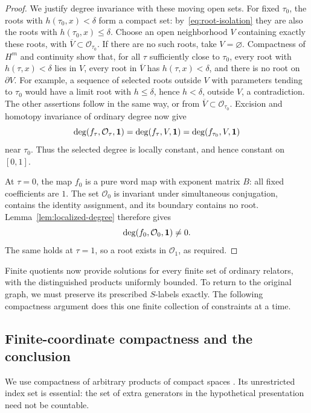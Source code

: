 \begin{proof}
We justify degree invariance with these moving open sets.  For fixed
$\tau_0$, the roots with $h(\tau_0,x)<\delta$ form a compact set:
by~\eqref{eq:root-isolation} they are also the roots with
$h(\tau_0,x)\le\delta$.  Choose an open neighborhood $V$ containing
exactly these roots, with
$\overline V\subset\mathcal O_{\tau_0}$.
If there are no such roots, take $V=\varnothing$.
Compactness of $H^m$ and continuity show that, for all $\tau$ sufficiently
close to $\tau_0$, every root with $h(\tau,x)<\delta$ lies in $V$,
every root in $\overline V$ has $h(\tau,x)<\delta$, and there is no
root on $\partial V$.  For example, a sequence of selected roots
outside $V$ with parameters tending to $\tau_0$ would have a limit
root with $h\le\delta$, hence $h<\delta$, outside $V$, a contradiction.
The other assertions follow in the same way, or from
$\overline V\subset\mathcal O_{\tau_0}$.
Excision and homotopy invariance of ordinary degree now give
\[
 \deg(f_\tau,\mathcal O_\tau,\mathbf 1)
       =\deg(f_\tau,V,\mathbf 1)
       =\deg(f_{\tau_0},V,\mathbf 1)
\]
near $\tau_0$.  Thus the selected degree is locally constant, and hence
constant on $[0,1]$.

At $\tau=0$, the map $f_0$ is a pure word map with exponent matrix $B$:
all fixed coefficients are $1$.  The set $\mathcal O_0$ is invariant
under simultaneous conjugation, contains the identity assignment,
and its boundary contains no root.  Lemma~\ref{lem:localized-degree}
therefore gives
\[
 \deg(f_0,\mathcal O_0,\mathbf 1)\ne0.
\]
The same holds at $\tau=1$, so a root exists in $\mathcal O_1$, as
required.
\end{proof}

Finite quotients now provide solutions for every finite set of ordinary
relators, with the distinguished products uniformly bounded. To return
to the original graph, we must preserve its prescribed $S$-labels exactly.
The following compactness argument does this one finite collection of
constraints at a time.

\subsection{Finite-coordinate compactness and the conclusion}

We use compactness of arbitrary products of compact spaces
\cite[Theorem~37.3]{Munkres2000}. Its unrestricted index set is essential:
the set of extra generators in the hypothetical presentation need not
be countable.

